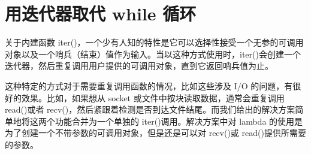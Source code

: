 \section{用迭代器取代 while 循环}
关于内建函数 iter()，一个少有人知的特性是它可以选择性接受一个无参的可调用对象以及一个哨兵（结束）值作为输入。当以这种方式使用时，iter()会创建一个迭代器，然后重复调用用户提供的可调用对象，直到它返回哨兵值为止。

这种特定的方式对于需要重复调用函数的情况，比如这些涉及 I/O 的问题，有很好的效果。比如，如果想从 socket 或文件中按块读取数据，通常会重复调用 read()或者 recv()，然后紧跟着检测是否到达文件结尾。而我们给出的解决方案简单地将这两个功能合并为一个单独的 iter()调用。解决方案中对 lambda 的使用是为了创建一个不带参数的可调用对象，但是还是可以对 recv()或 read()提供所需要的参数。